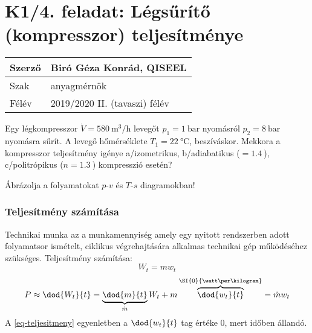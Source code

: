 \section*{K1/4. feladat: Légsűrítő (kompresszor) teljesítménye} 
\begin{tabular}{ | p{2cm} | p{14cm} | } 
	\hline
	Szerző & Biró Géza Konrád, 	QISEEL \\ 
	\hline
	Szak & anyagmérnök\\ 
	\hline
	Félév & 2019/2020 II. (tavaszi) félév \\ 
	\hline
\end{tabular}
\vspace{0.5cm}

\noindent  Egy légkompresszor $\dot{V} = \SI{580}{\meter\cubed\per\hour}$ levegőt $p_1=\SI{1}{\bar}$ nyomásról $p_2=\SI{8}{\bar}$ nyomásra sűrít. A levegő hőmérséklete $T_1=\SI{22}{\celsius}$, beszíváskor. Mekkora a kompresszor teljesítmény igénye a/izometrikus, b/adiabatikus  ($=\SI{1,4}{}$), c/politrópikus ($n = \SI{1,3}{} $) kompresszió esetén? 

\vspace{2mm}
\noindent Ábrázolja a folyamatokat $p$-$v$ és $T$-$s$ diagramokban!



\subsubsection{Teljesítmény számítása}
Technikai munka az a munkamennyiség amely egy nyitott rendszerben adott folyamatsor ismételt, ciklikus végrehajtására alkalmas technikai gép működéséhez szükséges.
Teljesítmény számítása:
\begin{equation*}
	W_t=mw_t
\end{equation*}
\begin{equation}
P\approx \dod{W_t}{t}=\underbrace{\dod{m}{t} }_{\dot{m}} W_t + m \overbrace{ \dod{w_t}{t}}^{\SI{0}{\watt\per\kilogram}}=\dot{m} w_t
\label{eq-teljesitmeny}
\end{equation}
A \ref{eq-teljesitmeny} egyenletben a $\dod{w_t}{t}$ tag értéke 0, mert időben állandó.



\noindent\hrulefill
